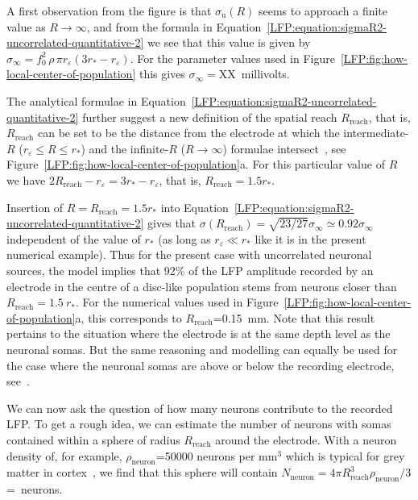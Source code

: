 A first observation from the figure is that $\sigma_\text{u}(R)$ seems to approach a finite
value as $R \rightarrow \infty$, and from the formula in Equation~\ref{LFP:equation:sigmaR2-uncorrelated-quantitative-2}  
we see that this value is given by $\sigma_\infty = f_0^2 \, \rho \, \pi r_\varepsilon (3 r_* - r_\varepsilon)$. For the parameter values used in Figure~\ref{LFP:fig:how-local-center-of-population} this gives  
$\sigma_\infty=$XX~millivolts. 

The analytical formulae in Equation~\ref{LFP:equation:sigmaR2-uncorrelated-quantitative-2} 
further suggest a new definition of the spatial reach $R_\text{reach}$, that is, $R_\text{reach}$ 
can be set to be the distance from the electrode at which the 
intermediate-$R$ ($r_\varepsilon \le R \le r_*$) and the 
infinite-$R$ ($R \rightarrow \infty$) formulae intersect~\cite{Einevoll2013a}, see 
Figure~\ref{LFP:fig:how-local-center-of-population}a. For this particular value of $R$ we have 
$2R_\text{reach}-r_\varepsilon=3 r_* - r_\varepsilon$, that is, $R_\text{reach} =1.5 r_*$. 

Insertion of $R=R_\text{reach}=1.5 r_*$ into Equation~\ref{LFP:equation:sigmaR2-uncorrelated-quantitative-2} 
gives that $\sigma (R_\text{reach})=\sqrt{23/27}\sigma_\infty \simeq 0.92 \sigma_\infty$ independent of the value of $r_*$ (as long as $r_\varepsilon \ll r_*$ like it is in the present numerical example). Thus for the present case with uncorrelated neuronal sources, the model implies that 92\% of the LFP amplitude recorded by an electrode in the centre of a disc-like population 
stems from neurons closer than $R_\text{reach}=1.5~r_*$. For the numerical values
used in Figure~\ref{LFP:fig:how-local-center-of-population}a,
this corresponds to $R_\text{reach}$=0.15~mm. 
Note that this result pertains to the situation where the electrode is at the same depth level as the neuronal somas. But the same reasoning and modelling can equally be used for the case where the neuronal somas are above or below the recording electrode, see~\citet{Einevoll2013a}.

We can now ask the question of how many neurons contribute to the recorded LFP. To get a rough idea,
we can estimate the number of neurons with somas contained within a sphere of radius $R_\text{reach}$
around the electrode. With a neuron density of, for example, $\rho_\text{neuron}$=50000 neurons per mm$^3$ which is typical for grey matter in 
cortex~, we find that this sphere will contain $N_\text{neuron}=4 \pi R_\text{reach}^3 \rho_\text{neuron}/3$=~neurons.


